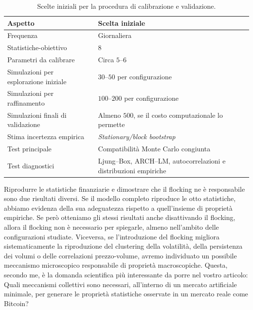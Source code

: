\begin{table}[h]
    \centering
    \small
    \renewcommand{\arraystretch}{1.35}
    \begin{tabularx}{\textwidth}{X X}
        \toprule
        \textbf{Aspetto} 
        & \textbf{Scelta iniziale} \\
        \midrule
        
        Frequenza
        & Giornaliera \\
        
        Statistiche-obiettivo
        & $8$ \\
        
        Parametri da calibrare
        & Circa $5$--$6$ \\
        
        Simulazioni per esplorazione iniziale
        & $30$--$50$ per configurazione \\
        
        Simulazioni per raffinamento
        & $100$--$200$ per configurazione \\
        
        Simulazioni finali di validazione
        & Almeno $500$, se il costo computazionale lo permette \\
        
        Stima incertezza empirica
        & \emph{Stationary/block bootstrap} \\
        
        Test principale
        & Compatibilità Monte Carlo congiunta \\
        
        Test diagnostici
        & Ljung--Box, ARCH--LM, autocorrelazioni e distribuzioni empiriche \\
        
        \bottomrule
    \end{tabularx}
    \caption{Scelte iniziali per la procedura di calibrazione e validazione.}
    \label{tab:scelte-iniziali-calibrazione}
\end{table}

Riprodurre le statistiche finanziarie e dimostrare che il flocking ne è responsabile sono due risultati diversi.
Se il modello completo riproduce le otto statistiche, abbiamo evidenza della sua adeguatezza rispetto a quell'insieme di proprietà empiriche.
Se però otteniamo gli stessi risultati anche disattivando il flocking, allora il flocking non è necessario per spiegarle, almeno nell'ambito delle 
configurazioni studiate.
Viceversa, se l'introduzione del flocking migliora sistematicamente la riproduzione del clustering della volatilità, della persistenza dei volumi o 
delle correlazioni prezzo-volume, avremo individuato un possibile meccanismo microscopico responsabile di proprietà macroscopiche.
Questa, secondo me, è la domanda scientifica più interessante da porre nel vostro articolo:
Quali meccanismi collettivi sono necessari, all'interno di un mercato artificiale minimale, per generare le proprietà statistiche osservate in un mercato reale come Bitcoin?